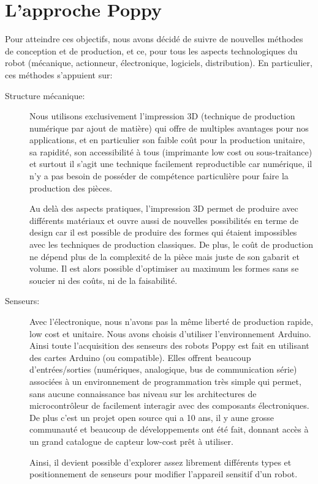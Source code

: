 \section*{L'approche Poppy}

Pour atteindre ces objectifs, nous avons décidé de suivre de nouvelles méthodes de conception et de production, et ce, pour tous les aspects technologiques du robot (mécanique, actionneur, électronique, logiciels, distribution). En particulier, ces méthodes s'appuient sur:


\begin{description}
  \item[Structure mécanique:] Nous utilisons exclusivement l'impression 3D (technique de production numérique par ajout de matière) qui offre de multiples avantages pour nos applications, et en particulier son faible coût pour la production unitaire, sa rapidité, son accessibilité à tous (imprimante low cost ou sous-traitance) et surtout il s'agit une technique facilement reproductible car numérique, il n'y a pas besoin de posséder de compétence particulière pour faire la production des pièces. 

  Au delà des aspects pratiques, l'impression 3D permet de produire avec différents matériaux et ouvre aussi de nouvelles possibilités en terme de design car il est possible de produire des formes qui étaient impossibles avec les techniques de production classiques. De plus, le coût de production ne dépend plus de la complexité de la pièce mais juste de son gabarit et volume. 
  Il est alors possible d'optimiser au maximum les formes sans se soucier ni des coûts, ni de la faisabilité.

  \item[Senseurs:] Avec l'électronique, nous n'avons pas la même liberté de production rapide, low cost et unitaire. Nous avons choisis d'utiliser l'environnement Arduino. Ainsi toute l'acquisition des senseurs des robots Poppy est fait en utilisant des cartes Arduino (ou compatible). Elles offrent beaucoup d'entrées/sorties (numériques, analogique, bus de communication série) associées à un environnement de programmation très simple qui permet, sans aucune connaissance bas niveau sur les architectures de microcontrôleur de facilement interagir avec des composants électroniques.
  De plus c'est un projet open source qui a 10 ans, il y aune grosse communauté et beaucoup de développements ont été fait, donnant accès à un grand catalogue de capteur low-cost prêt à utiliser.

  Ainsi, il devient possible d'explorer assez librement différents types et positionnement de senseurs pour modifier l'appareil sensitif d'un robot.


\end{description}
